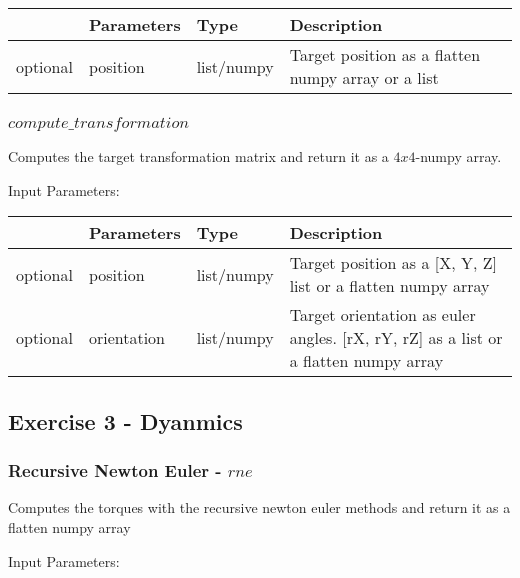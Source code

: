 \documentclass[
	ngerman,
	accentcolor=9c,%
	type=intern,
	marginpar=false
	]{tudapub}
\begin{document}
\begin{tabular}{|p{}|p{}|p{}| p{}|}
\hline
 & \textbf{Parameters} & \textbf{Type} & \textbf{Description} \\
\hline
optional & position & list/numpy & Target position as a flatten numpy array or a list \\
\hline
\end{tabular}


\subsubsection{$compute\_transformation$}
\noindent Computes the target transformation matrix and return it as a $4x4$-numpy array.

\vspace{0.5cm}
\noindent Input Parameters:
\vspace{0.5cm}

\begin{tabular}{|p{}|p{}|p{}| p{}|}
\hline
 & \textbf{Parameters} & \textbf{Type} & \textbf{Description} \\
\hline
optional & position & list/numpy & Target position as a [X, Y, Z] list or a flatten numpy array \\
\hline
optional & orientation & list/numpy & Target orientation as euler angles. [rX, rY, rZ] as a list or a flatten numpy array \\
\hline
\end{tabular}


\vspace{0.5cm}
\subsection{Exercise 3 - Dyanmics}
\subsubsection{Recursive Newton Euler - $rne$}
\noindent Computes the torques with the recursive newton euler methods and return it  as a flatten numpy array

\vspace{0.5cm}
\noindent Input Parameters:
\vspace{0.5cm}
\end{document}
